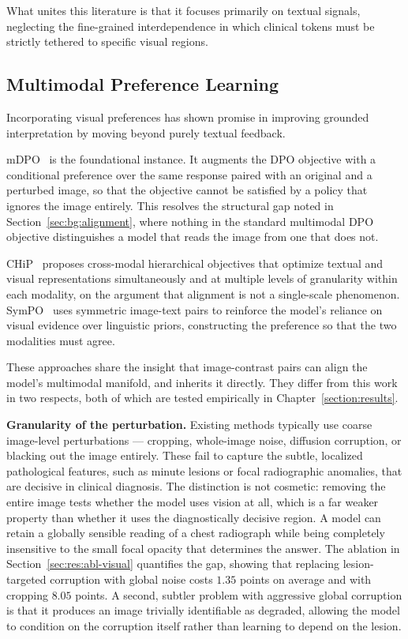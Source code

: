 What unites this literature is that it focuses primarily on textual signals, neglecting the fine-grained interdependence in which clinical tokens must be strictly tethered to specific visual regions.

\subsection{Multimodal Preference Learning}
\label{sec:rel:multimodal}

Incorporating visual preferences has shown promise in improving grounded interpretation by moving beyond purely textual feedback.

mDPO~\cite{wang2024mdpo} is the foundational instance. It augments the DPO objective with a conditional preference over the same response paired with an original and a perturbed image, so that the objective cannot be satisfied by a policy that ignores the image entirely. This resolves the structural gap noted in Section~\ref{sec:bg:alignment}, where nothing in the standard multimodal DPO objective distinguishes a model that reads the image from one that does not.

CHiP~\cite{fu2025chip} proposes cross-modal hierarchical objectives that optimize textual and visual representations simultaneously and at multiple levels of granularity within each modality, on the argument that alignment is not a single-scale phenomenon. SymPO~\cite{shukla2025sympo} uses symmetric image-text pairs to reinforce the model's reliance on visual evidence over linguistic priors, constructing the preference so that the two modalities must agree.

These approaches share the insight that image-contrast pairs can align the model's multimodal manifold, and \ourloss{} inherits it directly. They differ from this work in two respects, both of which are tested empirically in Chapter~\ref{section:results}.

\textbf{Granularity of the perturbation.} Existing methods typically use coarse image-level perturbations --- cropping, whole-image noise, diffusion corruption, or blacking out the image entirely. These fail to capture the subtle, localized pathological features, such as minute lesions or focal radiographic anomalies, that are decisive in clinical diagnosis. The distinction is not cosmetic: removing the entire image tests whether the model uses vision at all, which is a far weaker property than whether it uses the diagnostically decisive region. A model can retain a globally sensible reading of a chest radiograph while being completely insensitive to the small focal opacity that determines the answer. The ablation in Section~\ref{sec:res:abl-visual} quantifies the gap, showing that replacing lesion-targeted corruption with global noise costs $1.35$ points on average and with cropping $8.05$ points. A second, subtler problem with aggressive global corruption is that it produces an image trivially identifiable as degraded, allowing the model to condition on the corruption itself rather than learning to depend on the lesion.

